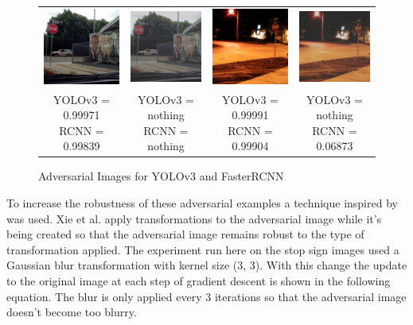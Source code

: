 \documentclass{article}
\begin{document}
\begin{figure}[h]
\begin{tabular}{c c@{\hskip 1cm} c c}
        \includegraphics[width=0.2\linewidth]{../test_images/stop3.png} &  \includegraphics[width=0.2\linewidth]{../test_images/ensemble_adversarials/stop3.png} & 
        \includegraphics[width=0.2\linewidth]{../test_images/stop4.png} &  \includegraphics[width=0.2\linewidth]{../test_images/ensemble_adversarials/stop4.png} \\

        \makecell[t]{YOLOv3 = 0.99971 \\ RCNN = 0.99839} & \makecell[t]{YOLOv3 = nothing \\ RCNN = nothing} & \makecell[t]{YOLOv3 = 0.99991 \\ RCNN = 0.99904} & \makecell[t]{YOLOv3 = nothing \\ RCNN = 0.06873} \\
    \end{tabular}
\caption{Adversarial Images for YOLOv3 and FasterRCNN}
\label{fig:ensembleadversarial}
\end{figure}

To increase the robustness of these adversarial examples a technique inspired by \cite{xie2019improving} was used. Xie et al. apply transformations to the adversarial image while it's being created so that the adversarial image remains robust to the type of transformation applied. The experiment run here on the stop sign images used a Gaussian blur transformation with kernel size (3, 3). With this change the update to the original image at each step of gradient descent is shown in the following equation. The blur is only applied every 3 iterations so that the adversarial image doesn't become too blurry.
\end{document}
